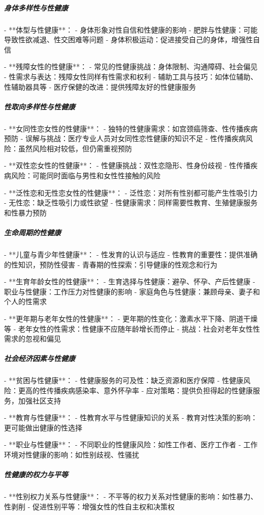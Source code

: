 \begin{enumerate}
\subparagraph{身体多样性与性健康}

- **体型与性健康**：
  - 身体形象对性自信和性健康的影响
  - 肥胖与性健康：可能导致性欲减退、性交困难等问题
  - 身体积极运动：促进接受自己的身体，增强性自信

- **残障女性的性健康**：
  - 常见的性健康挑战：身体限制、沟通障碍、社会偏见
  - 性需求与表达：残障女性同样有性需求和权利
  - 辅助工具与技巧：如体位辅助、性辅助器具等
  - 医疗保健的改进：提供残障友好的性健康服务

\subparagraph{性取向多样性与性健康}

- **女同性恋女性的性健康**：
  - 独特的性健康需求：如宫颈癌筛查、性传播疾病预防
  - 误解与挑战：医疗专业人员对女同性恋性健康的知识不足
  - 性传播疾病风险：虽然风险相对较低，但仍需重视预防

- **双性恋女性的性健康**：
  - 性健康挑战：双性恋隐形、性身份歧视
  - 性传播疾病风险：可能同时面临与男性和女性性接触的风险

- **泛性恋和无性恋女性的性健康**：
  - 泛性恋：对所有性别都可能产生性吸引力
  - 无性恋：缺乏性吸引力或性欲望
  - 性健康需求：同样需要性教育、生殖健康服务和性暴力预防

\subparagraph{生命周期的性健康}

- **儿童与青少年性健康**：
  - 性发育的认识与适应
  - 性教育的重要性：提供准确的性知识，预防性侵害
  - 青春期的性探索：引导健康的性观念和行为

- **生育年龄女性的性健康**：
  - 生育选择与性健康：避孕、怀孕、产后性健康
  - 职业与性健康：工作压力对性健康的影响
  - 家庭角色与性健康：兼顾母亲、妻子和个人的性需求

- **更年期与老年女性的性健康**：
  - 更年期的性变化：激素水平下降、阴道干燥等
  - 老年女性的性需求：性健康不应随年龄增长而停止
  - 挑战：社会对老年女性性需求的忽视和偏见

\subparagraph{社会经济因素与性健康}

- **贫困与性健康**：
  - 性健康服务的可及性：缺乏资源和医疗保障
  - 性健康风险：更高的性传播疾病感染率、意外怀孕率
  - 应对策略：提供负担得起的性健康服务，加强社区支持

- **教育与性健康**：
  - 性教育水平与性健康知识的关系
  - 教育对性决策的影响：更可能做出健康的性选择

- **职业与性健康**：
  - 不同职业的性健康风险：如性工作者、医疗工作者
  - 工作环境对性健康的影响：如性别歧视、性骚扰

\subparagraph{性健康的权力与平等}

- **性别权力关系与性健康**：
  - 不平等的权力关系对性健康的影响：如性暴力、性剥削
  - 促进性别平等：增强女性的性自主权和决策权


\end{enumerate}
